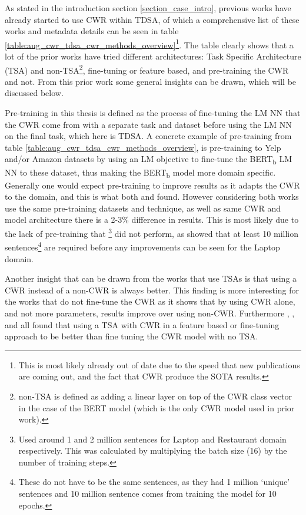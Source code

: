 As stated in the introduction section \ref{section_case_intro}, previous works have already started to use CWR within TDSA, of which a comprehensive list of these works and metadata details can be seen in table \ref{table:aug_cwr_tdsa_cwr_methods_overview}\footnote{This is most likely already out of date due to the speed that new publications are coming out, and the fact that CWR produce the SOTA results.}. The table clearly shows that a lot of the prior works have tried different architectures: Task Specific Architecture (TSA) and non-TSA\footnote{non-TSA is defined as adding a linear layer on top of the CWR class vector in the case of the BERT model (which is the only CWR model used in prior work).}, fine-tuning or feature based, and pre-training the CWR and not. From this prior work some general insights can be drawn, which will be discussed below.

Pre-training in this thesis is defined as the process of fine-tuning the LM NN that the CWR come from with a separate task and dataset before using the LM NN on the final task, which here is TDSA. A concrete example of pre-training from table \ref{table:aug_cwr_tdsa_cwr_methods_overview}, is pre-training to Yelp and/or Amazon datasets by using an LM objective to fine-tune the BERT\textsubscript{b} LM NN to these dataset, thus making the BERT\textsubscript{b} model more domain specific. Generally one would expect pre-training to improve results as it adapts the CWR to the domain, and this is what both \citet{rietzler2019adapt} and \citet{xu-etal-2019-bert} found. However considering both works use the same pre-training datasets and technique, as well as same CWR and model architecture there is a 2-3\% difference in results. This is most likely due to the lack of pre-training that \citet{xu-etal-2019-bert}\footnote{Used around 1 and 2 million sentences for Laptop and Restaurant domain respectively. This was calculated by multiplying the batch size (16) by the number of training steps.} did not perform, as \citet{rietzler2019adapt} showed that at least 10 million sentences\footnote{These do not have to be the same sentences, as they had 1 million `unique' sentences and 10 million sentence comes from training the model for 10 epochs.} are required before any improvements can be seen for the Laptop domain.

Another insight that can be drawn from the works that use TSAs \citep{zeng2019lcf,zhao2019modeling,song2019attentional,huang-carley-2019-syntax, jiang-etal-2019-challenge} is that using a CWR instead of a non-CWR is always better. This finding is more interesting for the works that do not fine-tune the CWR \citep{zhao2019modeling, huang-carley-2019-syntax} as it shows that by using CWR alone, and not more parameters, results improve over using non-CWR. Furthermore \citet{song2019attentional}, \citet{jiang-etal-2019-challenge}, and \citet{huang-carley-2019-syntax} all found that using a TSA with CWR in a feature based or fine-tuning approach to be better than fine tuning the CWR model with no TSA.

